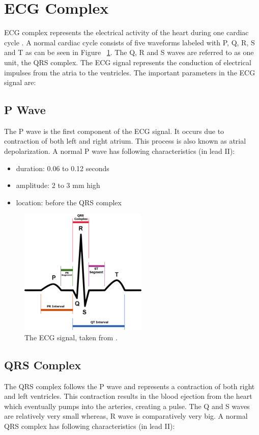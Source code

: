 \section{ECG Complex}
ECG complex represents the electrical activity of the heart during one cardiac cycle \cite{wilkins2005ecg}. A normal cardiac cycle consists of five waveforms labeled with P, Q, R, S and T as can be seen in Figure ~\ref{fig:SinusRhythmLabels}. The Q, R and S waves are referred to as one unit, the QRS complex. The ECG signal represents the conduction of electrical impulses from the atria to the ventricles. The important parameters in the ECG signal are:

\subsection{P Wave}

The P wave is the first component of the ECG signal. It occurs due to contraction of both left and right atrium. This process is also known as atrial depolarization. A normal P wave has following characteristics (in lead II):
\begin{itemize}
	\item duration: 0.06 to 0.12 seconds
	\item amplitude: 2 to 3 mm high
	\item location: before the QRS complex
\end{itemize}

\begin{figure}[htpb]
	\centering
	\includegraphics[width=\textwidth,height=6cm,keepaspectratio=true]{images/SinusRhythmLabels}
	\caption{
		The ECG signal, taken from \cite{wiki:SinusRhythmLabels}.
	}
	\label{fig:SinusRhythmLabels}
\end{figure}

\subsection{QRS Complex}
The QRS complex follows the P wave and represents a contraction of both right and left ventricles. This contraction results in the blood ejection from the heart which eventually pumps into the arteries, creating a pulse. The Q and S waves are relatively very small whereas, R wave is comparatively very big. A normal QRS complex has following characteristics (in lead II):

